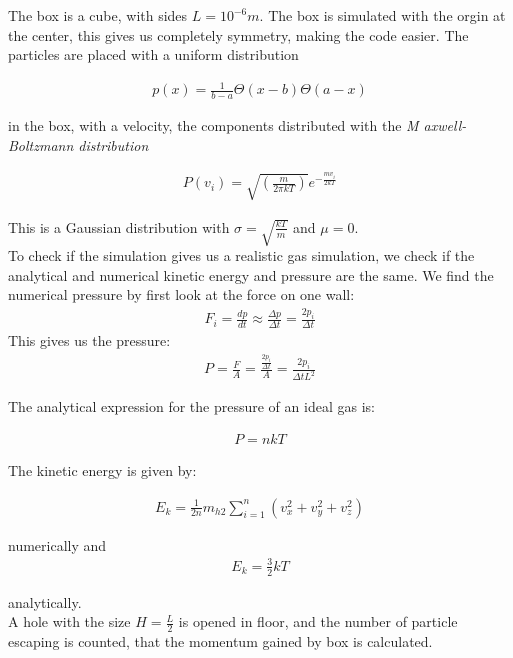 \documentclass[a4paper, 10pt]{article}
\begin{document}
The box is a cube, with sides $L = 10^{-6}m$. The box is simulated with the orgin at the center, this gives us completely symmetry, making the code easier. The particles are placed with a uniform distribution 

\begin{align}
p(x) = \frac{1}{b-a}\Theta(x-b)\Theta(a-x)
\end{align}

in the box, with a velocity, the components distributed with the \textit{M axwell-Boltzmann distribution}

\begin{align}
P(v_i) = \sqrt{\left( \frac{m}{2 \pi k T} \right)} e^{-\frac{m v_i}{2kT}}
\end{align}

This is a Gaussian distribution with $\sigma = \sqrt{ \frac{kT}{m}}$
and $\mu = 0$.\\

To check if the simulation gives us a realistic gas simulation, we check if the analytical and numerical kinetic energy and pressure are the same. We find the numerical pressure by first look at the force on one wall:
\begin{align}
F_i = \frac{dp}{dt} \approx \frac{\Delta p}{\Delta t} = \frac{2p_i}{\Delta t}
\end{align}
This gives us the pressure:
\begin{align}
P = \frac{F}{A} = \frac{\frac{2p_i}{\Delta t}}{A} = \frac{2p_i}{\Delta t L^{2}}
\end{align}

The analytical expression for the pressure of an ideal gas is:

\begin{align}
P = nkT
\end{align}


The kinetic energy is given by:

\begin{align}
E_k = \frac{1}{2n}m_{h2}\sum\limits_{i=1}^{n}(v_x^{2} + v_y^{2} + v_z^{2})
\end{align}

numerically and
\begin{align}
 E_k = \frac{3}{2}kT
\end{align}

analytically. \\

A hole with the size $H =\frac{L}{2}$ is opened in floor, and the number of particle escaping is counted, that the momentum gained by box is calculated.\\
\end{document}
